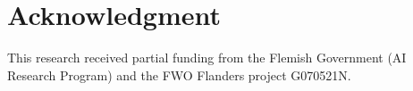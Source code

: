 \section*{Acknowledgment}
This research received partial funding
from the Flemish Government (AI Research Program) and the
FWO Flanders project G070521N.
